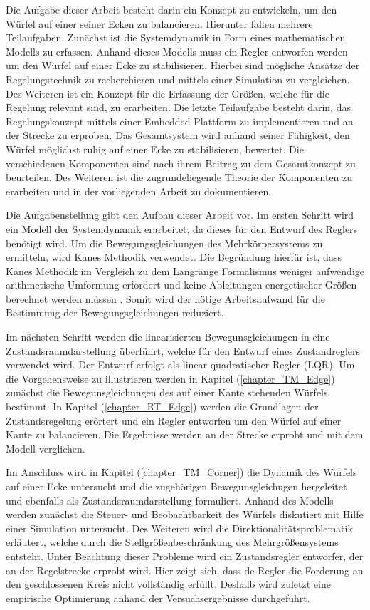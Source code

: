 Die Aufgabe dieser Arbeit besteht darin ein Konzept zu entwickeln, um den Würfel auf einer seiner Ecken zu balancieren. Hierunter fallen mehrere Teilaufgaben. Zunächst ist die Systemdynamik in Form eines mathematischen Modells zu erfassen. Anhand dieses Modells muss ein Regler entworfen werden um den Würfel auf einer Ecke zu stabilisieren. Hierbei sind mögliche Ansätze der Regelungstechnik zu recherchieren und mittels einer Simulation zu vergleichen. Des Weiteren ist ein Konzept für die Erfassung der Größen, welche für die Regelung relevant sind, zu erarbeiten. Die letzte Teilaufgabe besteht darin, das Regelungskonzept mittels einer Embedded Plattform zu implementieren und an der Strecke zu erproben. Das Gesamtsystem wird anhand seiner Fähigkeit, den Würfel möglichst ruhig auf einer Ecke zu stabilisieren, bewertet. Die verschiedenen Komponenten sind nach ihrem Beitrag zu dem Gesamtkonzept zu beurteilen. Des Weiteren ist die zugrundeliegende Theorie der Komponenten zu erarbeiten und in der vorliegenden Arbeit zu dokumentieren.

Die Aufgabenstellung gibt den Aufbau dieser Arbeit vor. Im ersten Schritt wird ein Modell der Systemdynamik erarbeitet, da dieses für den Entwurf des Reglers benötigt wird. Um die Bewegungsgleichungen des Mehrkörpersystems zu ermitteln, wird Kanes Methodik \cite{KaneBook} verwendet. Die Begründung hierfür ist, dass Kanes Methodik im Vergleich zu dem Langrange Formalismus weniger aufwendige arithmetische Umformung erfordert und keine Ableitungen energetischer Größen berechnet werden müssen \cite[S. 61 ff.]{Zetina}. Somit wird der nötige Arbeitsaufwand für die Bestimmung der Bewegungsgleichungen reduziert.

Im nächsten Schritt werden die linearisierten Bewegunsgleichungen in eine Zustandsraumdarstellung überführt, welche für den Entwurf eines Zustandreglers verwendet wird. Der Entwurf erfolgt als linear quadratischer Regler (LQR). Um die Vorgehensweise zu illustrieren werden in  Kapitel (\ref{chapter_TM_Edge}) zunächst die Bewegunsgleichungen des auf einer Kante stehenden Würfels bestimmt. In Kapitel (\ref{chapter_RT_Edge}) werden die Grundlagen der Zustandsregelung erörtert und ein Regler entworfen um den Würfel auf einer Kante zu balancieren. Die Ergebnisse werden an der Strecke erprobt und mit dem Modell verglichen.

Im Anschluss wird in Kapitel (\ref{chapter_TM_Corner}) die Dynamik des Würfels auf einer Ecke untersucht und die zugehörigen Bewegunsgleichugen hergeleitet und ebenfalls als Zustandsraumdarstellung formuliert. Anhand des Modells werden zunächst die Steuer- und Beobachtbarkeit des Würfels diskutiert mit Hilfe einer Simulation untersucht. Des Weiteren wird die Direktionalitätsproblematik erläutert, welche durch die Stellgrößenbeschränkung des Mehrgrößensystems entsteht. Unter Beachtung dieser Probleme wird ein Zustandsregler entworfer, der an der Regelstrecke erprobt wird. Hier zeigt sich, dass de Regler die Forderung an den geschlossenen Kreis nicht vollständig erfüllt. Deshalb wird zuletzt eine empirische Optimierung anhand der Versuchsergebnisse durchgeführt.

